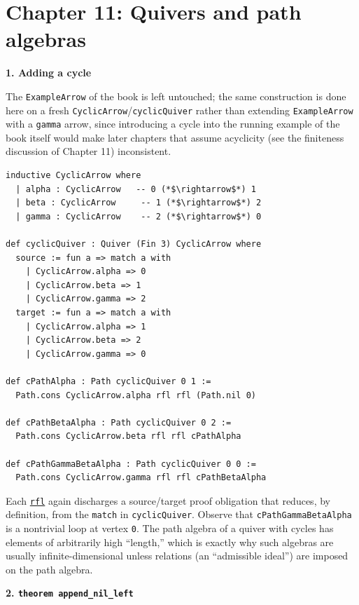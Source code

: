 \section{Chapter 11: Quivers and path algebras}\label{sec:14-appendix-solutions:10-chapter-11:1}

\textbf{1. Adding a cycle}

The \texttt{ExampleArrow} of the book is left untouched; the same construction is done here on a fresh \texttt{CyclicArrow}/\texttt{cyclicQuiver} rather than extending \texttt{ExampleArrow} with a \texttt{gamma} arrow, since introducing a cycle into the running example of the book itself would make later chapters that assume acyclicity (see the finiteness discussion of Chapter 11) inconsistent.

\begin{lstlisting}
inductive CyclicArrow where
  | alpha : CyclicArrow   -- 0 (*$\rightarrow$*) 1
  | beta : CyclicArrow     -- 1 (*$\rightarrow$*) 2
  | gamma : CyclicArrow    -- 2 (*$\rightarrow$*) 0

def cyclicQuiver : Quiver (Fin 3) CyclicArrow where
  source := fun a => match a with
    | CyclicArrow.alpha => 0
    | CyclicArrow.beta => 1
    | CyclicArrow.gamma => 2
  target := fun a => match a with
    | CyclicArrow.alpha => 1
    | CyclicArrow.beta => 2
    | CyclicArrow.gamma => 0

def cPathAlpha : Path cyclicQuiver 0 1 :=
  Path.cons CyclicArrow.alpha rfl rfl (Path.nil 0)

def cPathBetaAlpha : Path cyclicQuiver 0 2 :=
  Path.cons CyclicArrow.beta rfl rfl cPathAlpha

def cPathGammaBetaAlpha : Path cyclicQuiver 0 0 :=
  Path.cons CyclicArrow.gamma rfl rfl cPathBetaAlpha
\end{lstlisting}

Each \href{https://lean-lang.org/doc/reference/latest/Tactic-Proofs/Tactic-Reference/}{\texttt{rfl}} again discharges a source/target proof obligation that reduces, by definition, from the \texttt{match} in \texttt{cyclicQuiver}. Observe that \texttt{cPathGammaBetaAlpha} is a nontrivial loop at vertex \texttt{0}. The path algebra of a quiver with cycles has elements of arbitrarily high ``length,'' which is exactly why such algebras are usually infinite-dimensional unless relations (an ``admissible ideal'') are imposed on the path algebra.

\textbf{2. \texttt{theorem append\_\allowbreak{}nil\_\allowbreak{}left}}

